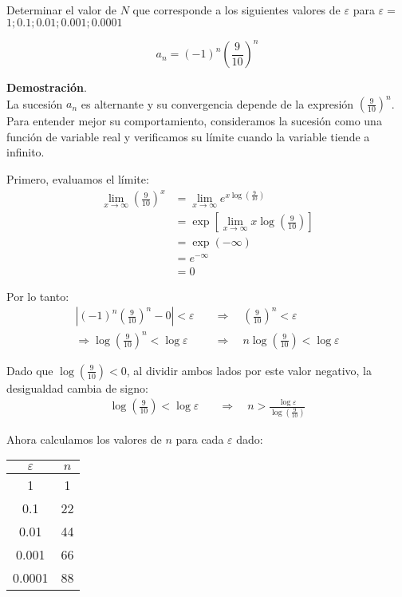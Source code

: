 \documentclass{article}
\begin{document}
    Determinar el valor de $N$ que corresponde a los siguientes valores de $\varepsilon$ para $\varepsilon=$ $1; 0.1; 0.01; 0.001; 0.0001$

    $$
    a_{n} = (-1)^{n}\left(\frac{9}{10}\right)^{n}
    $$

    \textbf{Demostración}.\\

    La sucesión $a_{n}$ es alternante y su convergencia depende de la expresión $\left(\frac{9}{10}\right)^{n}$. Para entender mejor su comportamiento, consideramos la sucesión como una función de variable real y verificamos su límite cuando la variable tiende a infinito.

    Primero, evaluamos el límite:
    \begin{align*}
    \lim_{x \rightarrow \infty} \left(\frac{9}{10}\right)^{x} &= \lim_{x \rightarrow \infty} e^{x \log \left(\frac{9}{10}\right)} \\
    &= \exp \left[ \lim_{x \rightarrow \infty} x \log \left(\frac{9}{10}\right) \right] \\
    &= \exp(-\infty) \\
    &= e^{-\infty} \\
    &= 0
    \end{align*}

    Por lo tanto:
    \begin{align*}
    \left| (-1)^{n}\left(\frac{9}{10}\right)^{n} - 0 \right| < \varepsilon \quad &\Rightarrow \quad \left( \frac{9}{10} \right)^{n} < \varepsilon \\
    \Rightarrow \log \left( \frac{9}{10} \right)^{n} < \log \varepsilon \quad &\Rightarrow \quad n \log \left( \frac{9}{10} \right) < \log \varepsilon
    \end{align*}

    Dado que $\log \left(\frac{9}{10}\right) < 0$, al dividir ambos lados por este valor negativo, la desigualdad cambia de signo:
    \begin{align*}
    \log \left( \frac{9}{10} \right) < \log \varepsilon \quad &\Rightarrow \quad n > \frac{\log \varepsilon}{\log \left( \frac{9}{10} \right)}
    \end{align*}

    Ahora calculamos los valores de $n$ para cada $\varepsilon$ dado:

    \begin{center}
    \begin{tabular}{c|c}
    $\varepsilon$ & $n$ \\
    \hline
    1 & 1 \\
    \hline
    0.1 & 22 \\
    \hline
    0.01 & 44 \\
    \hline
    0.001 & 66 \\
    \hline
    0.0001 & 88 \\
    \end{tabular}
    \end{center}
\end{document}
